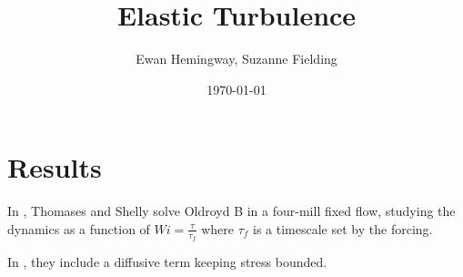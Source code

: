 \documentclass[10pt,twocolumn]{article}
\begin{document}
\title{Elastic Turbulence}
\author{Ewan Hemingway, Suzanne Fielding}

\date{\today}

\maketitle

\section{Results}

In \cite{Thomases2007}, Thomases and Shelly solve Oldroyd B in a four-mill fixed flow, studying the dynamics as a function of $Wi = \frac{\tau}{\tau_f}$ where $\tau_f$ is a timescale set by the forcing.

In \cite{Thomases2011}, they include a diffusive term keeping stress bounded.
\end{document}
